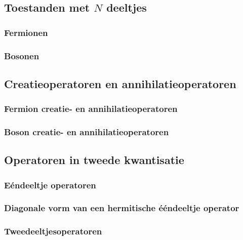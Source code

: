 \documentclass[a4paper,twoside]{article}
\theoremstyle{definition}
\theoremstyle{plain}
\begin{document}
\subsection{Toestanden met $N$ deeltjes}
\subsubsection{Fermionen}
\subsubsection{Bosonen}
\subsection{Creatieoperatoren en annihilatieoperatoren}
\subsubsection{Fermion creatie- en annihilatieoperatoren}
\subsubsection{Boson creatie- en annihilatieoperatoren}
\subsection{Operatoren in tweede kwantisatie}
\subsubsection{Eéndeeltje operatoren}
\subsubsection{Diagonale vorm van een hermitische ééndeeltje operator}
\subsubsection{Tweedeeltjesoperatoren}





\nocite{*} %

\end{document}
